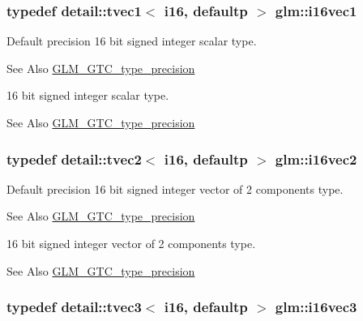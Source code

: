 \hypertarget{group__gtc__type__precision_gaa3a2fe05ca6a7086c5580922ebda4bf3}{
\subsubsection[{i16vec1}]{\setlength{\rightskip}{0pt plus 5cm}typedef detail\-::tvec1$<$ i16, defaultp $>$ {\bf glm\-::i16vec1}}}\label{group__gtc__type__precision_gaa3a2fe05ca6a7086c5580922ebda4bf3}
Default precision 16 bit signed integer scalar type. \begin{DoxySeeAlso}{See Also}
\hyperlink{group__gtc__type__precision}{G\-L\-M\-\_\-\-G\-T\-C\-\_\-type\-\_\-precision}
\end{DoxySeeAlso}
16 bit signed integer scalar type. \begin{DoxySeeAlso}{See Also}
\hyperlink{group__gtc__type__precision}{G\-L\-M\-\_\-\-G\-T\-C\-\_\-type\-\_\-precision} 
\end{DoxySeeAlso}
\hypertarget{group__gtc__type__precision_ga13f7a88281faec6a72231dce73ce6129}{
\subsubsection[{i16vec2}]{\setlength{\rightskip}{0pt plus 5cm}typedef detail\-::tvec2$<$ i16, defaultp $>$ {\bf glm\-::i16vec2}}}\label{group__gtc__type__precision_ga13f7a88281faec6a72231dce73ce6129}
Default precision 16 bit signed integer vector of 2 components type. \begin{DoxySeeAlso}{See Also}
\hyperlink{group__gtc__type__precision}{G\-L\-M\-\_\-\-G\-T\-C\-\_\-type\-\_\-precision}
\end{DoxySeeAlso}
16 bit signed integer vector of 2 components type. \begin{DoxySeeAlso}{See Also}
\hyperlink{group__gtc__type__precision}{G\-L\-M\-\_\-\-G\-T\-C\-\_\-type\-\_\-precision} 
\end{DoxySeeAlso}
\hypertarget{group__gtc__type__precision_ga22ec113d49837ef823048bb01511564c}{
\subsubsection[{i16vec3}]{\setlength{\rightskip}{0pt plus 5cm}typedef detail\-::tvec3$<$ i16, defaultp $>$ {\bf glm\-::i16vec3}}}\label{group__gtc__type__precision_ga22ec113d49837ef823048bb01511564c}
